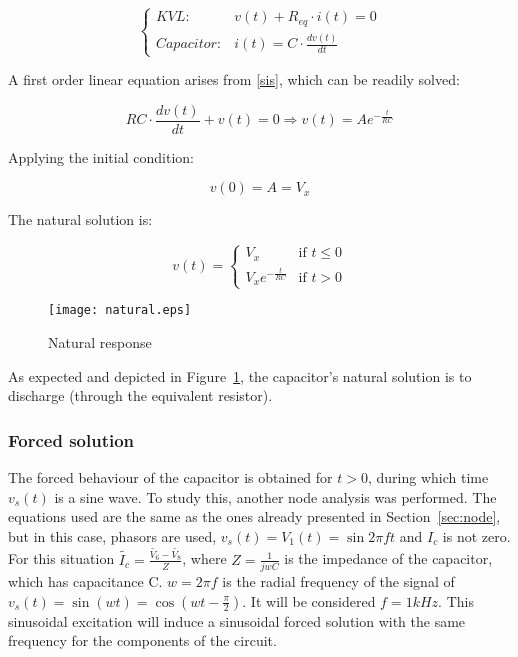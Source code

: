 \begin{equation}
  \begin{cases}
    KVL: & v(t) + R_{eq} \cdot i(t) = 0 \\
    Capacitor: & i(t) = C \cdot \frac{dv(t)}{dt}
  \end{cases}
  \label{sis}
\end{equation}

A first order linear equation arises from \ref{sis}, which can be readily solved:

\begin{equation}
  RC \cdot \frac{dv(t)}{dt} + v(t) = 0 \Rightarrow v(t) = Ae^{-\frac{t}{RC}}
\end{equation}

Applying the initial condition:

\begin{equation}
  v(0) = A = V_x
\end{equation}

The natural solution is:

\begin{equation}
  \label{nat_sol} v(t) =
  \begin{cases}
    V_x & \mbox{if } t \leq 0 \\
    V_xe^{-\frac{t}{RC}} & \mbox{if } t > 0
  \end{cases}
\end{equation}

\begin{figure}[H]
  \centering
  \texttt{[image: natural.eps]}
  \caption{Natural response}
  \label{fig:nat}
\end{figure}

As expected and depicted in Figure~\ref{fig:nat}, the capacitor's natural solution is to discharge (through the equivalent resistor).

\subsubsection{Forced solution}	

The forced behaviour of the capacitor is obtained for $t > 0$, during which time $v_s(t)$ is a sine wave. To study this, another node analysis was performed. The equations used are the same as the ones already presented in Section~\ref{sec:node}, but in this case, phasors are used, $v_s(t) = V_1(t) = \sin{2\pi ft}$ and $I_c$ is not zero. For this situation $\widetilde{I_c} = \frac{\widetilde{V_6}-\widetilde{V_8}}{Z}$, where $Z = \frac{1}{jwC}$ is the impedance of the capacitor, which has capacitance C. $w = 2\pi f$ is the radial frequency of the signal of $v_s(t) = \sin(wt) = \cos(wt-\frac{\pi}{2})$. It will be considered $f = 1 kHz$. This sinusoidal excitation will induce a sinusoidal forced solution with the same frequency for the components of the circuit.

